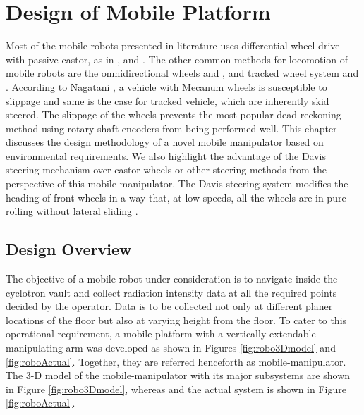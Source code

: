 \chapter{Design of Mobile Platform}
\label{ch_3:KPI}

Most of the mobile robots presented in literature uses differential wheel drive  with passive castor, as in \cite{yamamoto1992coordinating}, \cite{rajendran2004} and \cite{saha1989kinematics}. The other  common methods for locomotion of mobile robots are the omnidirectional wheels  \cite{pin1994new} and \cite{salih2006designing}, and tracked wheel system \cite{suthakorn2009design} and \cite{guarnieri2004development}. According  to  Nagatani \cite{nagatani2000improvement},  a  vehicle  with  Mecanum  wheels  is  susceptible  to slippage and same is the case for tracked vehicle, which are inherently skid steered. The slippage of the wheels prevents the most popular dead-reckoning method using rotary shaft  encoders   from  being  performed  well. This chapter   discusses the  design methodology of a novel mobile manipulator based on environmental requirements. We also  highlight the advantage of the Davis steering mechanism over castor wheels  or other steering methods from the perspective of this mobile manipulator.   The Davis steering system modifies the heading of  front wheels in a way that, at low speeds, all the wheels are in pure rolling without lateral sliding \cite{wong2008theory}.  


\section{Design Overview}
 The objective of a  mobile robot under consideration is to navigate inside the cyclotron vault and collect radiation intensity data at all the required points decided by the operator. Data is to be collected not only at different planer locations of the floor but also at varying height from the floor. To cater to this operational requirement, a mobile platform with a vertically extendable manipulating arm was developed as shown in  Figures \ref{fig:robo3Dmodel} and \ref{fig:roboActual}. Together, they are   referred henceforth as mobile-manipulator. The 3-D model of the mobile-manipulator with its major subsystems are shown in Figure \ref{fig:robo3Dmodel}, whereas  and the actual   system  is shown in Figure  \ref{fig:roboActual}. 

